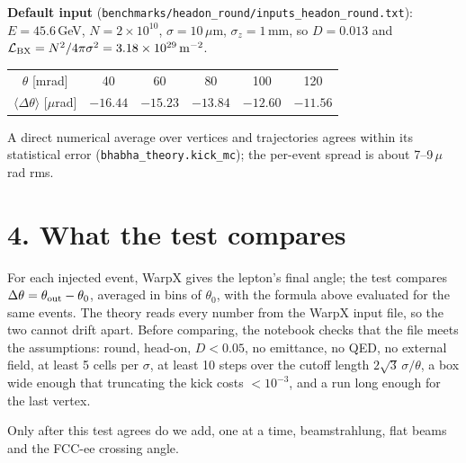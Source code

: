 \documentclass[11pt]{article}
\begin{document}
\textbf{Default input} (\texttt{benchmarks/headon\_round/inputs\_headon\_round.txt}): $E=45.6$\,GeV,
$N=2\times10^{10}$, $\sigma=10\,\mu$m, $\sigma_z=1$\,mm, so $D=0.013$ and
$\mathcal L_{\rm BX}=N^2/4\pi\sigma^2=3.18\times10^{29}\,\mathrm{m^{-2}}$.

\begin{center}
\begin{tabular}{cccccc}
\toprule
$\theta$ [mrad] & 40 & 60 & 80 & 100 & 120 \\
$\langle\Delta\theta\rangle$ [$\mu$rad] & $-16.44$ & $-15.23$ & $-13.84$ & $-12.60$ & $-11.56$ \\
\bottomrule
\end{tabular}
\end{center}
A direct numerical average over vertices and trajectories agrees within its statistical error
(\texttt{bhabha\_theory.kick\_mc}); the per-event spread is about 7--9\,$\mu$rad rms.

\section*{4. What the test compares}

For each injected event, WarpX gives the lepton's final angle; the test compares
$\Delta\theta=\theta_{\rm out}-\theta_0$, averaged in bins of $\theta_0$, with the formula above evaluated for
the same events. The theory reads every number from the WarpX input file, so the two cannot drift apart. Before
comparing, the notebook checks that the file meets the assumptions: round, head-on, $D<0.05$, no emittance, no QED,
no external field, at least 5 cells per $\sigma$, at least 10 steps over the cutoff length $2\sqrt3\,\sigma/\theta$,
a box wide enough that truncating the kick costs $<10^{-3}$, and a run long enough for the last vertex.

Only after this test agrees do we add, one at a time, beamstrahlung, flat beams and the FCC-ee crossing angle.
\end{document}
